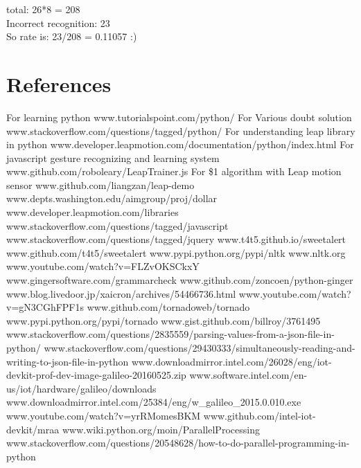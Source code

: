 \documentclass[11pt,a4paper]{article}
\begin{document}
    \vspace{.3cm}
	total: 26*8 =  208\\
	Incorrect recognition: 23\\
	So rate is: 23/208 = 0.11057    :)
    \newpage
	\section{References}
    \begin{thebibliography}{li}
        \bibitem For learning python www.tutorialspoint.com/python/
        \bibitem For Various doubt solution www.stackoverflow.com/questions/tagged/python/
        \bibitem For understanding leap library in python www.developer.leapmotion.com/documentation/python/index.html
        \bibitem For javascript gesture recognizing and learning system  www.github.com/roboleary/LeapTrainer.js
        \bibitem For \$1 algorithm with Leap motion sensor www.github.com/liangzan/leap-demo
        \bibitem  www.depts.washington.edu/aimgroup/proj/dollar
        \bibitem  www.developer.leapmotion.com/libraries
        \bibitem  www.stackoverflow.com/questions/tagged/javascript
        \bibitem  www.stackoverflow.com/questions/tagged/jquery
        \bibitem  www.t4t5.github.io/sweetalert
        \bibitem  www.github.com/t4t5/sweetalert
        \bibitem  www.pypi.python.org/pypi/nltk
        \bibitem  www.nltk.org
        \bibitem  www.youtube.com/watch?v=FLZvOKSCkxY
        \bibitem  www.gingersoftware.com/grammarcheck
        \bibitem  www.github.com/zoncoen/python-ginger
        \bibitem  www.blog.livedoor.jp/xaicron/archives/54466736.html
        \bibitem  www.youtube.com/watch?v=gN3CGhFPF1s
        \bibitem  www.github.com/tornadoweb/tornado
        \bibitem  www.pypi.python.org/pypi/tornado
        \bibitem  www.gist.github.com/billroy/3761495
        \bibitem  www.stackoverflow.com/questions/2835559/parsing-values-from-a-json-file-in-python/
        \bibitem  www.stackoverflow.com/questions/29430333/simultaneously-reading-and-writing-to-json-file-in-python
        \bibitem  www.downloadmirror.intel.com/26028/eng/iot-devkit-prof-dev-image-galileo-20160525.zip
        \bibitem  www.software.intel.com/en-us/iot/hardware/galileo/downloads
        \bibitem  www.downloadmirror.intel.com/25384/eng/w\_galileo\_2015.0.010.exe
        \bibitem  www.youtube.com/watch?v=yrRMomesBKM
        \bibitem  www.github.com/intel-iot-devkit/mraa
        \bibitem  www.wiki.python.org/moin/ParallelProcessing
        \bibitem  www.stackoverflow.com/questions/20548628/how-to-do-parallel-programming-in-python

\end{thebibliography}
\end{document}
